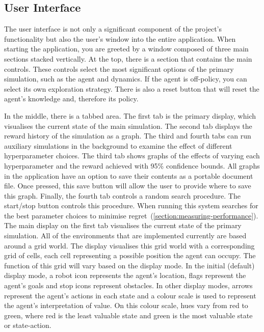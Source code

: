\documentclass[]{final_report}
\begin{document}
\subsection{User Interface}

The user interface is not only a significant component of the project's functionality but also the user's window into the entire application. When starting the application, you are greeted by a window composed of three main sections stacked vertically. At the top, there is a section that contains the main controls. These controls select the most significant options of the primary simulation, such as the agent and dynamics. If the agent is off-policy, you can select its own exploration strategy. There is also a reset button that will reset the agent's knowledge and, therefore its policy.

In the middle, there is a tabbed area. The first tab is the primary display, which visualises the current state of the main simulation. The second tab displays the reward history of the simulation as a graph. The third and fourth tabs can run auxiliary simulations in the background to examine the effect of different hyperparameter choices. The third tab shows graphs of the effects of varying each hyperparameter and the reward achieved with 95\% confidence bounds. All graphs in the application have an option to save their contents as a portable document file. Once pressed, this save button will allow the user to provide where to save this graph. Finally, the fourth tab controls a random search procedure. The start/stop button controls this procedure. When running this system searches for the best parameter choices to minimise regret~(\ref{section:measuring-performance}).
\newpage
The main display on the first tab visualises the current state of the primary simulation. All of the environments that are implemented currently are based around a grid world. The display visualises this grid world with a corresponding grid of cells, each cell representing a possible position the agent can occupy. The function of this grid will vary based on the display mode. In the initial (default) display mode, a robot icon represents the agent's location, flags represent the agent's goals and stop icons represent obstacles. In other display modes, arrows represent the agent's actions in each state and a colour scale is used to represent the agent's interpretation of value. On this colour scale, hues vary from red to green, where red is the least valuable state and green is the most valuable state or state-action.
\end{document}
